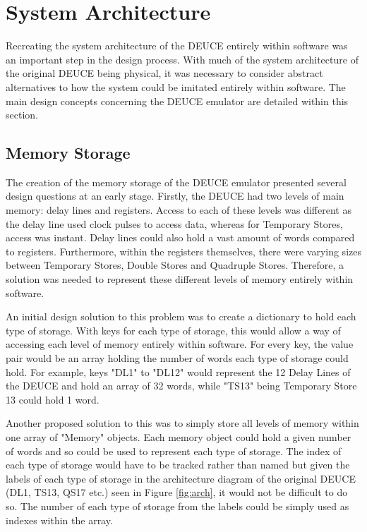 \documentclass{l4proj}
\begin{document}
\section{System Architecture}
Recreating the system architecture of the DEUCE entirely within software was an important step in the design process. With much of the system architecture of the original DEUCE being physical, it was necessary to consider abstract alternatives to how the system could be imitated entirely within software. The main design concepts concerning the DEUCE emulator are detailed within this section.

\subsection{Memory Storage}
The creation of the memory storage of the DEUCE emulator presented several design questions at an early stage. Firstly, the DEUCE had two levels of main memory: delay lines and registers. Access to each of these levels was different as the delay line used clock pulses to access data, whereas for Temporary Stores, access was instant. Delay lines could also hold a vast amount of words compared to registers. Furthermore, within the registers themselves, there were varying sizes between Temporary Stores, Double Stores and Quadruple Stores. Therefore, a solution was needed to represent these different levels of memory entirely within software.

An initial design solution to this problem was to create a dictionary to hold each type of storage. With keys for each type of storage, this would allow a way of accessing each level of memory entirely within software. For every key, the value pair would be an array holding the number of words each type of storage could hold. For example, keys "DL1" to "DL12" would represent the 12 Delay Lines of the DEUCE and hold an array of 32 words, while "TS13" being Temporary Store 13 could hold 1 word.

Another proposed solution to this was to simply store all levels of memory within one array of "Memory" objects. Each memory object could hold a given number of words and so could be used to represent each type of storage. The index of each type of storage would have to be tracked rather than named but given the labels of each type of storage in the architecture diagram of the original DEUCE (DL1, TS13, QS17 etc.) seen in Figure \ref{fig:arch}, it would not be difficult to do so. The number of each type of storage from the labels could be simply used as indexes within the array.
\end{document}
